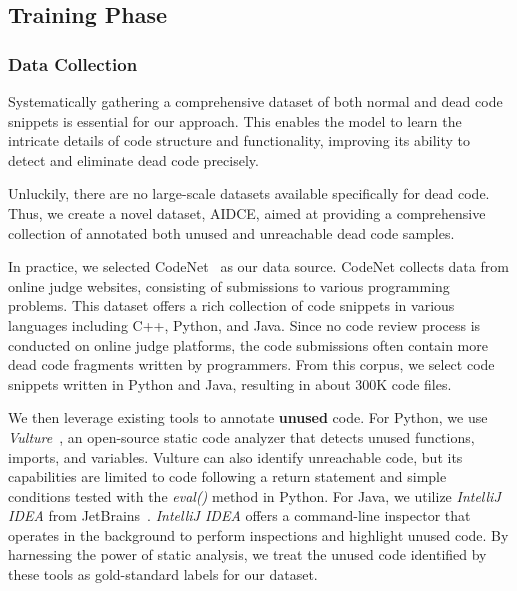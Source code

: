 \documentclass[11pt]{article}
\begin{document}
\subsection{Training Phase}

\subsubsection{Data Collection}
Systematically gathering a comprehensive dataset of both normal and dead code snippets is essential for our approach. This enables the model to learn the intricate details of code structure and functionality, improving its ability to detect and eliminate dead code precisely.

Unluckily, there are no large-scale datasets available specifically for dead code. Thus, we create a novel dataset, AIDCE, aimed at providing a comprehensive collection of annotated both unused and unreachable dead code samples.

In practice, we selected CodeNet~\cite{puri2021codenet} as our data source. CodeNet collects data from online judge websites, consisting of submissions to various programming problems. This dataset offers a rich collection of code snippets in various languages including C++, Python, and Java.
Since no code review process is conducted on online judge platforms, the code submissions often contain more dead code fragments written by programmers. From this corpus, we select code snippets written in Python and Java, resulting in about 300K code files.


We then leverage existing tools to annotate \textbf{unused} code. For Python, we use \textit{Vulture}~\cite{Vulture}, an open-source static code analyzer that detects unused functions, imports, and variables. Vulture can also identify unreachable code, but its capabilities are limited to code following a return statement and simple conditions tested with the \textit{eval()} method in Python. For Java, we utilize \textit{IntelliJ IDEA} from JetBrains~\cite{intellij2011most}. \textit{IntelliJ IDEA} offers a command-line inspector that operates in the background to perform inspections and highlight unused code. By harnessing the power of static analysis, we treat the unused code identified by these tools as gold-standard labels for our dataset.
\end{document}
